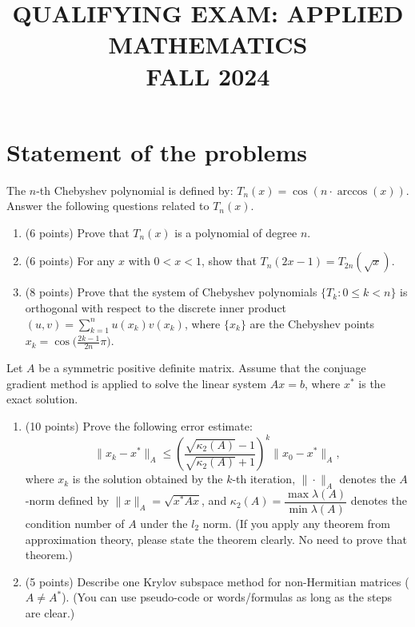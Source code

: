 \documentclass[11pt,a4paper]{article}
\title{\textbf{QUALIFYING EXAM: APPLIED MATHEMATICS}\\[0.5em]\Large FALL 2024}
\date{}
\author{}
\newcommand{\examstatement}[1]{%
  \par\addvspace{0.85em}%
  \noindent{\bfseries #1}\par\nobreak\addvspace{0.28em}%
}
\begin{document}
\maketitle
\vspace{-3em}

\tableofcontents

\section{Statement of the problems}

\examstatement{Problem 1. [20 points]}
The \(n\)-th Chebyshev polynomial is defined by: \(T_{n}(x) = \cos(n \cdot \arccos(x))\). Answer the following questions related to \(T_{n}(x)\).
\begin{enumerate}[label=(\roman*)]
    \item (6 points) Prove that \(T_{n}(x)\) is a polynomial of degree \(n\).
    \item (6 points) For any \(x\) with \(0 < x < 1\), show that \(T_{n}(2x - 1) = T_{2n}(\sqrt{x})\).
    \item (8 points) Prove that the system of Chebyshev polynomials \(\{T_{k} : 0 \le k < n\}\) is orthogonal with respect to the discrete inner product \((u, v) = \sum_{k=1}^{n} u(x_{k}) v(x_{k})\), where \(\{x_{k}\}\) are the Chebyshev points \(x_{k} = \cos\bigl(\frac{2k-1}{2n}\pi\bigr)\).
\end{enumerate}

\examstatement{Problem 2. [15 points]}
Let \(A\) be a symmetric positive definite matrix. Assume that the conjuage gradient method is applied to solve the linear system \(Ax = b\), where \(x^{*}\) is the exact solution.
\begin{enumerate}[label=(\roman*)]
    \item (10 points) Prove the following error estimate:
    \[
    \|x_{k} - x^{*}\|_{A} \le \left( \frac{\sqrt{\kappa_{2}(A)} - 1}{\sqrt{\kappa_{2}(A)} + 1} \right)^{k} \|x_{0} - x^{*}\|_{A},
    \]
    where \(x_{k}\) is the solution obtained by the \(k\)-th iteration, \(\|\cdot\|_{A}\) denotes the \(A\)-norm defined by \(\|x\|_{A} = \sqrt{x^{*} A x}\), and \(\kappa_{2}(A) = \dfrac{\max \lambda(A)}{\min \lambda(A)}\) denotes the condition number of \(A\) under the \(l_{2}\) norm. (If you apply any theorem from approximation theory, please state the theorem clearly. No need to prove that theorem.)
    \item (5 points) Describe one Krylov subspace method for non-Hermitian matrices (\(A \neq A^{*}\)). (You can use pseudo-code or words/formulas as long as the steps are clear.)
\end{enumerate}
\end{document}
